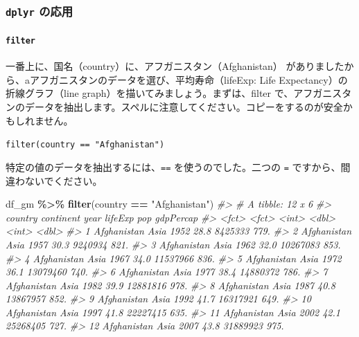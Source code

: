 \documentclass[
  xelatex, ja=standard]{bxjsbook}
\newenvironment{Shaded}{\begin{snugshade}}{\end{snugshade}}
\newcommand{\CommentTok}[1]{\textcolor[rgb]{0.56,0.35,0.01}{\textit{#1}}}
\newcommand{\FunctionTok}[1]{\textcolor[rgb]{0.13,0.29,0.53}{\textbf{#1}}}
\newcommand{\NormalTok}[1]{#1}
\newcommand{\SpecialCharTok}[1]{\textcolor[rgb]{0.81,0.36,0.00}{\textbf{#1}}}
\newcommand{\StringTok}[1]{\textcolor[rgb]{0.31,0.60,0.02}{#1}}
\theoremstyle{definition}
\theoremstyle{definition}
\theoremstyle{definition}
\theoremstyle{definition}
\theoremstyle{remark}
\begin{document}
\hypertarget{dplyr-ux306eux5fdcux7528}{%
\subsubsection{\texorpdfstring{\texttt{dplyr} の応用}{dplyr の応用}}\label{dplyr-ux306eux5fdcux7528}}

\hypertarget{filter}{%
\paragraph{\texorpdfstring{\texttt{filter}}{filter}}\label{filter}}

一番上に、国名（country）に、アフガニスタン（Afghanistan） がありましたから、aアフガニスタンのデータを選び、平均寿命（lifeExp: Life Expectancy）の折線グラフ（line graph）を描いてみましょう。まずは、filter で、アフガニスタンのデータを抽出します。スペルに注意してください。コピーをするのが安全かもしれません。

\texttt{filter(country\ ==\ "Afghanistan")}

特定の値のデータを抽出するには、\texttt{==} を使うのでした。二つの \texttt{=} ですから、間違わないでください。

\begin{Shaded}
\begin{Highlighting}[]
\NormalTok{df\_gm }\SpecialCharTok{\%\textgreater{}\%} \FunctionTok{filter}\NormalTok{(country }\SpecialCharTok{==} \StringTok{"Afghanistan"}\NormalTok{)}
\CommentTok{\#\textgreater{} \# A tibble: 12 x 6}
\CommentTok{\#\textgreater{}    country     continent  year lifeExp      pop gdpPercap}
\CommentTok{\#\textgreater{}    \textless{}fct\textgreater{}       \textless{}fct\textgreater{}     \textless{}int\textgreater{}   \textless{}dbl\textgreater{}    \textless{}int\textgreater{}     \textless{}dbl\textgreater{}}
\CommentTok{\#\textgreater{}  1 Afghanistan Asia       1952    28.8  8425333      779.}
\CommentTok{\#\textgreater{}  2 Afghanistan Asia       1957    30.3  9240934      821.}
\CommentTok{\#\textgreater{}  3 Afghanistan Asia       1962    32.0 10267083      853.}
\CommentTok{\#\textgreater{}  4 Afghanistan Asia       1967    34.0 11537966      836.}
\CommentTok{\#\textgreater{}  5 Afghanistan Asia       1972    36.1 13079460      740.}
\CommentTok{\#\textgreater{}  6 Afghanistan Asia       1977    38.4 14880372      786.}
\CommentTok{\#\textgreater{}  7 Afghanistan Asia       1982    39.9 12881816      978.}
\CommentTok{\#\textgreater{}  8 Afghanistan Asia       1987    40.8 13867957      852.}
\CommentTok{\#\textgreater{}  9 Afghanistan Asia       1992    41.7 16317921      649.}
\CommentTok{\#\textgreater{} 10 Afghanistan Asia       1997    41.8 22227415      635.}
\CommentTok{\#\textgreater{} 11 Afghanistan Asia       2002    42.1 25268405      727.}
\CommentTok{\#\textgreater{} 12 Afghanistan Asia       2007    43.8 31889923      975.}
\end{Highlighting}
\end{Shaded}
\end{document}
